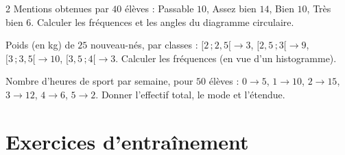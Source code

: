 \begin{multicols}{2}
\exo{} Mentions obtenues par $40$ élèves : Passable $10$, Assez bien $14$, Bien
$10$, Très bien $6$. Calculer les fréquences et les angles du diagramme circulaire.

\exo{} Poids (en kg) de $25$ nouveau-nés, par classes : $[2\,;2{,}5[\to3$,
$[2{,}5\,;3[\to9$, $[3\,;3{,}5[\to10$, $[3{,}5\,;4[\to3$. Calculer les fréquences (en vue
d'un histogramme).

\exo{} Nombre d'heures de sport par semaine, pour $50$ élèves : $0\to5$, $1\to10$,
$2\to15$, $3\to12$, $4\to6$, $5\to2$. Donner l'effectif total, le mode et l'étendue.

\end{multicols}

\section{Exercices d'entraînement}
